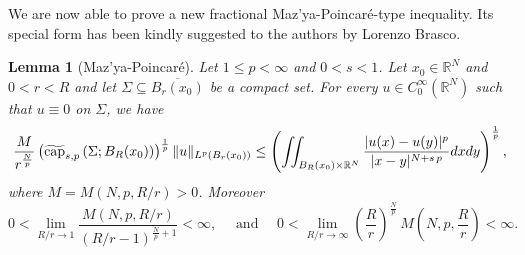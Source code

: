 \documentclass{amsart}
\newtheorem{lemma}[theorem]{Lemma}
\theoremstyle{definition}
\numberwithin{equation}{section}
\begin{document}
We are now able to prove a new fractional Maz'ya-Poincar\'e-type inequality. 
Its special form has been kindly suggested to the authors by Lorenzo Brasco.
\begin{lemma}[Maz'ya-Poincar\'e] \label{lm:mazya-poin}
	Let $1 \le p < \infty$ and $0 < s < 1$. Let $x_0 \in \mathbb{R}^N$ and $0 < r < R$ and let $\Sigma \subseteq  \overline{B_{r}(x_0)}$ be a compact set. For every $u \in C^\infty_0(\mathbb{R}^N)$ such that $u \equiv 0$ on $\Sigma$, we have 
	\begin{equation*}
		\frac{M}{r^{\frac{N}{p}}} \left(\widetilde{\rm cap}_{s,p}\left(\Sigma; B_{R}(x_0)\right)\right)^{\frac{1}{p}}  \|u\|_{L^p(B_r(x_0))} \le \left(\iint_{B_{R}(x_0) \times \mathbb{R}^N} \frac{|u(x) - u(y)|^p}{|x-y|^{N+s\,p}}dxdy\right)^{\frac{1}{p}},
	\end{equation*}
	where $M=M\left(N,p,R/r\right) > 0$. Moreover
\[
0 < \displaystyle \lim_{R/r \to 1} \frac{M\left(N,p, R/r\right)}{\left(R/r - 1\right)^{\frac{N}{p} + 1}} < \infty, \quad \mbox{ and } \quad 	0 < \lim_{R/r \to \infty}\left(\frac{R}{r}\right)^{\frac{N}{p}}\,M\left(N,p, \frac{R}{r}\right) < \infty.
\]
\end{lemma}
\end{document}
